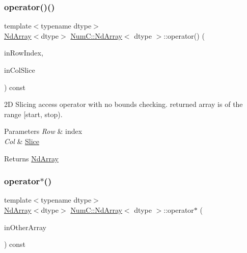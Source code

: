 \subsubsection{\texorpdfstring{operator()()}{operator()()}\hspace{0.1cm}{\footnotesize\ttfamily [5/5]}}
{\footnotesize\ttfamily template$<$typename dtype$>$ \\
\mbox{\hyperlink{class_num_c_1_1_nd_array}{Nd\+Array}}$<$dtype$>$ \mbox{\hyperlink{class_num_c_1_1_nd_array}{Num\+C\+::\+Nd\+Array}}$<$ dtype $>$\+::operator() (\begin{DoxyParamCaption}\item[{\mbox{\hyperlink{namespace_num_c_aa5a7e69266097d55816d4cdb19542b53}{int32}}}]{in\+Row\+Index,  }\item[{const \mbox{\hyperlink{class_num_c_1_1_slice}{Slice}} \&}]{in\+Col\+Slice }\end{DoxyParamCaption}) const\hspace{0.3cm}{\ttfamily [inline]}}

2D Slicing access operator with no bounds checking. returned array is of the range \mbox{[}start, stop).


\begin{DoxyParams}{Parameters}
{\em Row} & index \\
\hline
{\em Col} & \mbox{\hyperlink{class_num_c_1_1_slice}{Slice}} \\
\hline
\end{DoxyParams}
\begin{DoxyReturn}{Returns}
\mbox{\hyperlink{class_num_c_1_1_nd_array}{Nd\+Array}} 
\end{DoxyReturn}
\mbox{\label{class_num_c_1_1_nd_array_a7c3d42b830320dfd322e71757cb7e001}} 
\subsubsection{\texorpdfstring{operator$\ast$()}{operator*()}\hspace{0.1cm}{\footnotesize\ttfamily [1/2]}}
{\footnotesize\ttfamily template$<$typename dtype$>$ \\
\mbox{\hyperlink{class_num_c_1_1_nd_array}{Nd\+Array}}$<$dtype$>$ \mbox{\hyperlink{class_num_c_1_1_nd_array}{Num\+C\+::\+Nd\+Array}}$<$ dtype $>$\+::operator$\ast$ (\begin{DoxyParamCaption}\item[{const \mbox{\hyperlink{class_num_c_1_1_nd_array}{Nd\+Array}}$<$ dtype $>$ \&}]{in\+Other\+Array }\end{DoxyParamCaption}) const\hspace{0.3cm}{\ttfamily [inline]}}

